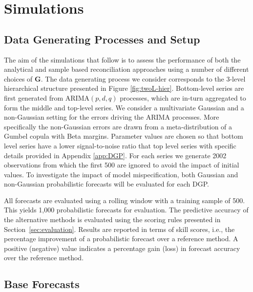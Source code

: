 \documentclass[12pt]{article}
\theoremstyle{definition}
\begin{document}
\section{Simulations}\label{sec:simulations}

\subsection{Data Generating Processes and Setup}

The aim of the simulations that follow is to assess the performance of both the analytical and sample based reconciliation approaches using a number of different choices of $\bm{G}$. The data generating process we consider corresponds to the 3-level hierarchical structure presented in Figure \ref{fig:twoL-hier}. Bottom-level series are first generated from ARIMA$(p,d,q)$ processes, which are in-turn aggregated to form the middle and top-level series. We consider a multivariate Gaussian and a non-Gaussian setting for the errors driving the ARIMA processes. More specifically the non-Gaussian errors are drawn from a meta-distribution of a Gumbel copula with Beta margins. Parameter values are chosen so that bottom level series have a lower signal-to-noise ratio that top level series with specific details provided in Appendix \ref{app:DGP}.  For each series we generate 2002 observations from which the first 500 are ignored to avoid the impact of initial values. To investigate the impact of model mispecification, both Gaussian and non-Gaussian probabilistic forecasts will be evaluated for each DGP.

All forecasts are evaluated using a rolling window with a training sample of 500. This yields 1,000 probabilistic forecasts for evaluation. The predictive accuracy of the alternative methods is evaluated using the scoring rules presented in Section~\ref{sec:evaluation}. Results are reported in terms of skill scores, i.e., the percentage improvement of a probabilistic forecast over a reference method. A positive (negative) value indicates a percentage gain (loss) in forecast accuracy over the reference method.

\subsection{Base Forecasts}
\end{document}
